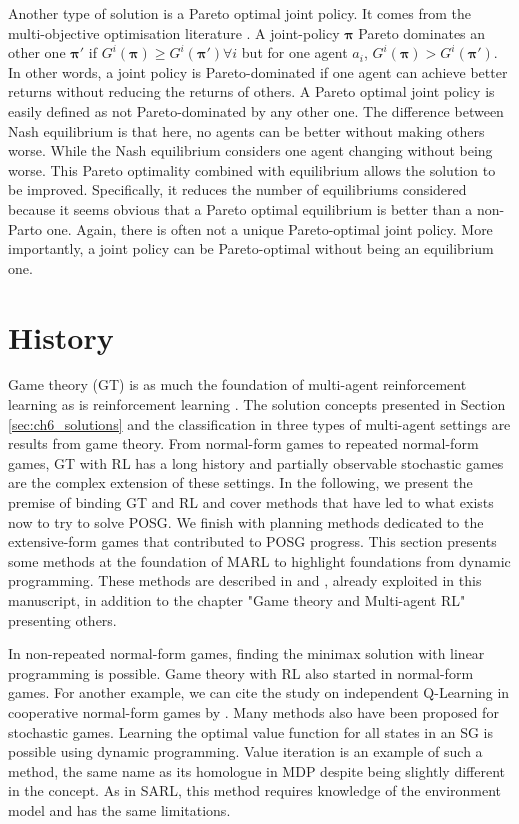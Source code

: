 Another type of solution is a Pareto optimal joint policy.
It comes from the multi-objective optimisation literature \citep{ehrgott2012vilfredo}.
A joint-policy $\mathbf{\pi}$ Pareto dominates an other one $\mathbf{\pi'}$ if $G^i(\mathbf{\pi}) \ge G^i(\mathbf{\pi'})\forall i$ but for one agent $a_i$, $G^i(\mathbf{\pi}) > G^i(\mathbf{\pi'})$.
In other words, a joint policy is Pareto-dominated if one agent can achieve better returns without reducing the returns of others.
A Pareto optimal joint policy is easily defined as not Pareto-dominated by any other one.
The difference between Nash equilibrium is that here, no agents can be better without making others worse.
While the Nash equilibrium considers one agent changing without being worse.
This Pareto optimality combined with equilibrium allows the solution to be improved.
Specifically, it reduces the number of equilibriums considered because it seems obvious that a Pareto optimal equilibrium is better than a non-Parto one.
Again, there is often not a unique Pareto-optimal joint policy.
More importantly, a joint policy can be Pareto-optimal without being an equilibrium one.

\section{History}\label{sec:ch6_history}
Game theory (GT) \citep{von1947theory} is as much the foundation of multi-agent reinforcement learning as is reinforcement learning \citep{Nowe2012GTMARL, marl-book}.
The solution concepts presented in Section \ref{sec:ch6_solutions} and the classification in three types of multi-agent settings are results from game theory.
From normal-form games to repeated normal-form games, GT with RL has a long history and partially observable stochastic games are the complex extension of these settings.
In the following, we present the premise of binding GT and RL and cover methods that have led to what exists now to try to solve POSG.
We finish with planning methods dedicated to the extensive-form games that contributed to POSG progress.
This section presents some methods at the foundation of MARL to highlight foundations from dynamic programming.
These methods are described in \citep{marl-book} and \citep{russel2010}, already exploited in this manuscript, in addition to the chapter "Game theory and Multi-agent RL" \citep{Nowe2012GTMARL} presenting others.

In non-repeated normal-form games, finding the minimax solution with linear programming \citep{marl-book} is possible.
Game theory with RL also started in normal-form games.
For another example, we can cite the study on independent Q-Learning in cooperative normal-form games by \cite{claus1998dynamics}.
Many methods also have been proposed for stochastic games.
Learning the optimal value function for all states in an SG is possible using dynamic programming.
Value iteration \citep{stochasticGames} is an example of such a method, the same name as its homologue in MDP \citep{sutton2018reinforcement} despite being slightly different in the concept.
As in SARL, this method requires knowledge of the environment model and has the same limitations.

